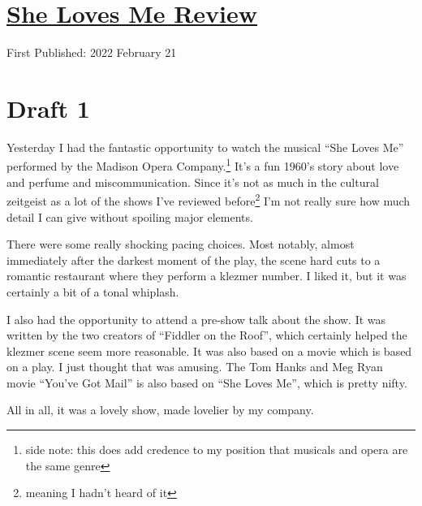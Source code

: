 \documentclass[12pt]{article}[titlepage]
\newcommand{\say}[1]{``#1''}
\newcommand{\1}{\={a}}
\newcommand{\2}{\={e}}
\newcommand{\3}{\={\i}}
\newcommand{\4}{\=o}
\newcommand{\5}{\=u}
\newcommand{\6}{\={A}}
\renewcommand{\,}{\textsuperscript{,}}
\begin{document}
\doublespacing
\section{\href{she-loves-me.html}{She Loves Me Review}}
First Published: 2022 February 21

\section{Draft 1}
Yesterday I had the fantastic opportunity to watch the musical \say{She Loves Me} performed by the Madison Opera Company.\footnote{side note: this does add credence to my position that musicals and opera are the same genre}
It's a fun 1960's story about love and perfume and miscommunication.
Since it's not as much in the cultural zeitgeist as a lot of the shows I've reviewed before\footnote{meaning I hadn't heard of it} I'm not really sure how much detail I can give without spoiling major elements.

There were some really shocking pacing choices.
Most notably, almost immediately after the darkest moment of the play, the scene hard cuts to a romantic restaurant where they perform a klezmer number.
I liked it, but it was certainly a bit of a tonal whiplash.

I also had the opportunity to attend a pre-show talk about the show.
It was written by the two creators of \say{Fiddler on the Roof}, which certainly helped the klezmer scene seem more reasonable.
It was also based on a movie which is based on a play.
I just thought that was amusing.
The Tom Hanks and Meg Ryan movie \say{You've Got Mail} is also based on \say{She Loves Me}, which is pretty nifty.

All in all, it was a lovely show, made lovelier by my company.
\end{document}
